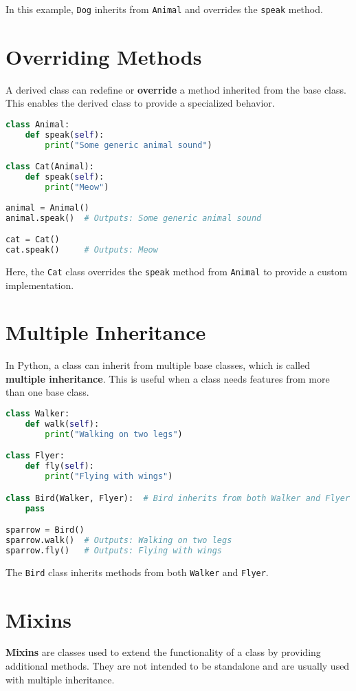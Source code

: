 \documentclass{article}
\begin{document}
In this example, \texttt{Dog} inherits from \texttt{Animal} and overrides the \texttt{speak} method.

\section{Overriding Methods}
A derived class can redefine or \textbf{override} a method inherited from the base class. This enables the derived class to provide a specialized behavior.

\begin{lstlisting}[language=Python]
class Animal:
    def speak(self):
        print("Some generic animal sound")

class Cat(Animal):
    def speak(self):
        print("Meow")
        
animal = Animal()
animal.speak()  # Outputs: Some generic animal sound

cat = Cat()
cat.speak()     # Outputs: Meow
\end{lstlisting}

Here, the \texttt{Cat} class overrides the \texttt{speak} method from \texttt{Animal} to provide a custom implementation.

\section{Multiple Inheritance}
In Python, a class can inherit from multiple base classes, which is called \textbf{multiple inheritance}. This is useful when a class needs features from more than one base class.

\begin{lstlisting}[language=Python]
class Walker:
    def walk(self):
        print("Walking on two legs")

class Flyer:
    def fly(self):
        print("Flying with wings")

class Bird(Walker, Flyer):  # Bird inherits from both Walker and Flyer
    pass

sparrow = Bird()
sparrow.walk()  # Outputs: Walking on two legs
sparrow.fly()   # Outputs: Flying with wings
\end{lstlisting}

The \texttt{Bird} class inherits methods from both \texttt{Walker} and \texttt{Flyer}.

\section{Mixins}
\textbf{Mixins} are classes used to extend the functionality of a class by providing additional methods. They are not intended to be standalone and are usually used with multiple inheritance.
\end{document}
